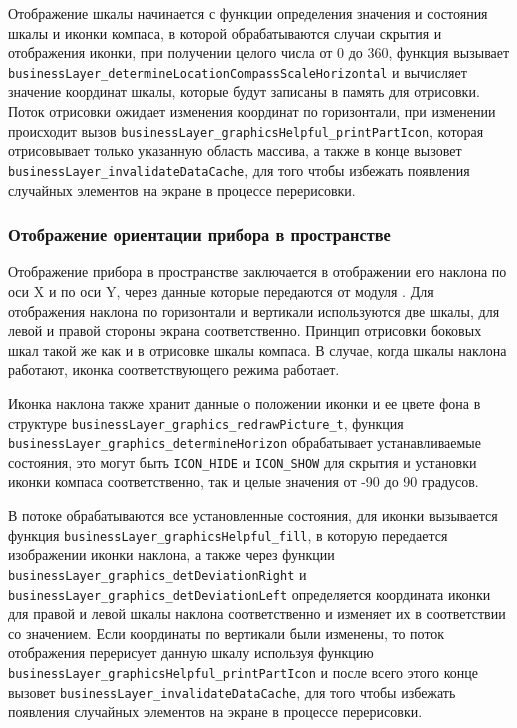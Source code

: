 Отображение шкалы начинается с функции определения значения и состояния шкалы и иконки компаса, в которой обрабатываются случаи скрытия и отображения иконки, при получении целого числа
от 0 до 360, функция вызывает \lstinline{businessLayer_determineLocationCompassScaleHorizontal} и вычисляет значение координат шкалы, которые будут записаны в память для отрисовки.
Поток отрисовки ожидает изменения координат по горизонтали, при изменении происходит вызов \lstinline{businessLayer_graphicsHelpful_printPartIcon}, которая отрисовывает только указанную
область массива, а также в конце вызовет \lstinline{businessLayer_invalidateDataCache}, для того чтобы избежать появления случайных элементов на экране в процессе перерисовки.

\subsubsection{Отображение ориентации прибора в пространстве}

Отображение прибора в пространстве заключается в отображении его наклона по оси X и по оси Y, через данные которые передаются от модуля \moduleOrientationAzimuth.
Для отображения наклона по горизонтали и вертикали используются две шкалы, для левой и правой стороны экрана соответственно. Принцип отрисовки боковых шкал такой же как
и в отрисовке шкалы компаса. В случае, когда шкалы наклона работают, иконка соответствующего режима работает. 

Иконка наклона также хранит данные о положении иконки и ее цвете фона в структуре \lstinline{businessLayer_graphics_redrawPicture_t}, функция \lstinline{businessLayer_graphics_determineHorizon}
обрабатывает устанавливаемые состояния, это могут быть \lstinline{ICON_HIDE} и \lstinline{ICON_SHOW} для скрытия и установки иконки компаса соответственно, 
так и целые значения от -90 до 90 градусов.

В потоке обрабатываются все установленные состояния, для иконки вызывается функция \lstinline{businessLayer_graphicsHelpful_fill}, в которую передается
изображении иконки наклона, а также через функции \lstinline{businessLayer_graphics_detDeviationRight} и \lstinline{businessLayer_graphics_detDeviationLeft} определяется координата иконки
для правой и левой шкалы наклона соответственно и изменяет их в соответствии со значением. Если координаты по вертикали были изменены, то поток отображения перерисует данную шкалу
используя функцию \lstinline{businessLayer_graphicsHelpful_printPartIcon} и после всего этого конце вызовет \lstinline{businessLayer_invalidateDataCache},
для того чтобы избежать появления случайных элементов на экране в процессе перерисовки.

